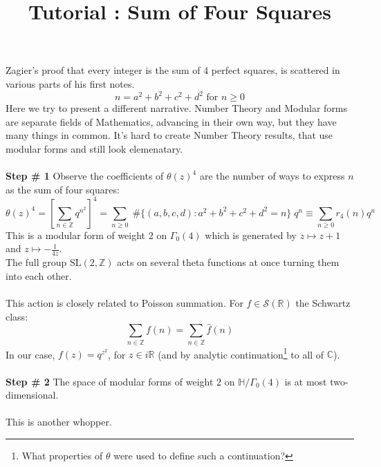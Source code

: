 \documentclass[12pt]{article}
\title{Tutorial : Sum of Four Squares}
\date{}
\begin{document}
\selectfont \fontsize{12.5}{15}\selectfont

\maketitle

\noindent Zagier's proof that every integer is the sum of 4 perfect squares, is scattered in various parts of his first notes. 
$$ n = a^2 + b^2 + c^2 + d^2 \text{ for } n \geq 0$$
Here we try to present a different narrative.  Number Theory and Modular forms are separate fields of Mathematics, advancing in their own way, but they have many things in common. It's hard to create Number Theory results, that use modular forms and still look elemenatary. \\ \\
\textbf{Step \# 1} Observe the coefficients of $\theta(z)^4$ are the number of ways to express $n$ as the sum of four squares:
$$ \theta(z)^4 = \left[ \sum_{n \in \mathbb{Z}}  q^{n^2} \right]^4 = \sum_{n \geq 0}\; 
\#\Big\{ (a,b,c,d): a^2 + b^2 + c^2 + d^2 = n  \Big\} \; q^n
\equiv \sum_{n \geq 0} r_4(n) q^n $$
This is a modular form of weight $2$ on $\Gamma_0(4)$ which is generated by $z \mapsto z + 1$ and $z \mapsto  - \frac{1}{4z}$. \\
The full group $\text{SL}(2, \mathbb{Z})$ acts on several theta functions at once turning them into each other. \\ \\
This action is closely related to Poisson summation.  For $f \in \mathcal{S}(\mathbb{R})$ the Schwartz class:
$$ \sum_{n \in \mathbb{Z}} f(n) = \sum_{n \in \mathbb{Z}} \hat{f}(n) $$
In our case, $f(z) = q^{z^2}$, for $z \in i \mathbb{R}$ (and by analytic continuation\footnote{What properties of $\theta$ were used to define such a continuation?} to all of $\mathbb{C}$). \\ \\
\textbf{Step \# 2} The space of modular forms of weight $2$ on $\mathbb{H}/\Gamma_0(4)$ is at most two-dimensional. \\ \\
This is another whopper.


\newpage
\end{document}
